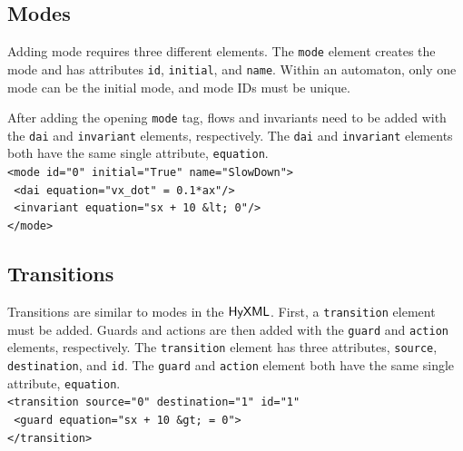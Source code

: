 \documentclass{tufte-book} %
\begin{document}
\subsection{Modes}
Adding mode requires three different elements. The \texttt{mode} element creates the mode and has attributes \texttt{id}, \texttt{initial}, and \texttt{name}. Within an automaton, only one mode can be the initial mode, and mode IDs must be unique.

After adding the opening \texttt{mode} tag, flows and invariants need to be added with the \texttt{dai} and \texttt{invariant} elements, respectively. The \texttt{dai} and \texttt{invariant} elements both have the same single attribute, \texttt{equation}.\\
\vspace{3mm}
\texttt{<mode id="0" initial="True" name="SlowDown">}\\
\texttt{  <dai equation="vx\_dot" = 0.1*ax"/>}\\
\texttt{  <invariant equation="sx + 10 \&lt; 0"/>}\\
\texttt{</mode>}

\subsection{Transitions}

Transitions are similar to modes in the ${{\sf HyXML}}$. First, a \texttt{transition} element must be added. Guards and actions are then added with the \texttt{guard} and \texttt{action} elements, respectively. The \texttt{transition} element has three attributes, \texttt{source}, \texttt{destination}, and \texttt{id}. The \texttt{guard} and \texttt{action} element both have the same single attribute, \texttt{equation}.\\
\vspace{3mm}
\texttt{<transition source="0" destination="1" id="1"}\\
\texttt{  <guard equation="sx + 10 \&gt; = 0">}\\
\texttt{</transition>}
\end{document}
